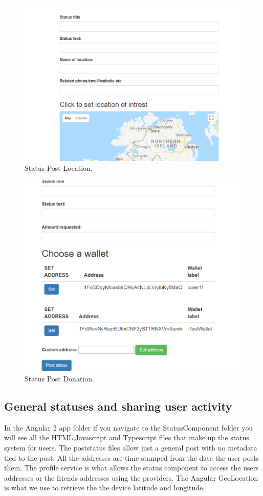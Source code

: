\begin{figure}[H]
\centering
\includegraphics[]{img/post4.png}
\caption{Status Post Location.}
\end{figure}

\begin{figure}[H]
\centering
\includegraphics[]{img/post5.png}
\caption{Status Post Donation.}
\end{figure}

\subsection{General statuses and sharing user activity}
In the Angular 2 app folder if you navigate to the StatusComponent folder you will see all the HTML,Javascript and Typescript files that make up the status system for users. The poststatus files allow just a general post with no metadata tied to the post. All the addresses are time-stamped from the date the user posts them. The profile service is what allows the status component to access the users addresses or the friends addresses using the providers. The Angular GeoLocation is what we use to retrieve the the device latitude and longitude.

